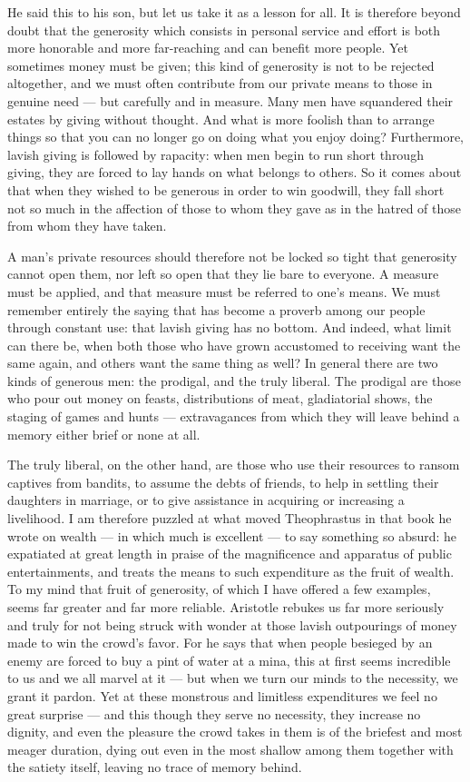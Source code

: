  He said this to his son, but let us take it as a lesson for all. It is therefore beyond doubt that the generosity which consists in personal service and effort is both more honorable and more far-reaching and can benefit more people. Yet sometimes money must be given; this kind of generosity is not to be rejected altogether, and we must often contribute from our private means to those in genuine need — but carefully and in measure. Many men have squandered their estates by giving without thought. And what is more foolish than to arrange things so that you can no longer go on doing what you enjoy doing? Furthermore, lavish giving is followed by rapacity: when men begin to run short through giving, they are forced to lay hands on what belongs to others. So it comes about that when they wished to be generous in order to win goodwill, they fall short not so much in the affection of those to whom they gave as in the hatred of those from whom they have taken.

 A man's private resources should therefore not be locked so tight that generosity cannot open them, nor left so open that they lie bare to everyone. A measure must be applied, and that measure must be referred to one's means. We must remember entirely the saying that has become a proverb among our people through constant use: that lavish giving has no bottom. And indeed, what limit can there be, when both those who have grown accustomed to receiving want the same again, and others want the same thing as well? In general there are two kinds of generous men: the prodigal, and the truly liberal. The prodigal are those who pour out money on feasts, distributions of meat, gladiatorial shows, the staging of games and hunts — extravagances from which they will leave behind a memory either brief or none at all.

 The truly liberal, on the other hand, are those who use their resources to ransom captives from bandits, to assume the debts of friends, to help in settling their daughters in marriage, or to give assistance in acquiring or increasing a livelihood. I am therefore puzzled at what moved Theophrastus in that book he wrote on wealth — in which much is excellent — to say something so absurd: he expatiated at great length in praise of the magnificence and apparatus of public entertainments, and treats the means to such expenditure as the fruit of wealth. To my mind that fruit of generosity, of which I have offered a few examples, seems far greater and far more reliable. Aristotle rebukes us far more seriously and truly for not being struck with wonder at those lavish outpourings of money made to win the crowd's favor. For he says that when people besieged by an enemy are forced to buy a pint of water at a mina, this at first seems incredible to us and we all marvel at it — but when we turn our minds to the necessity, we grant it pardon. Yet at these monstrous and limitless expenditures we feel no great surprise — and this though they serve no necessity, they increase no dignity, and even the pleasure the crowd takes in them is of the briefest and most meager duration, dying out even in the most shallow among them together with the satiety itself, leaving no trace of memory behind.

